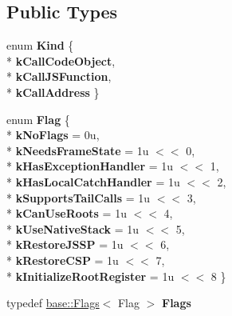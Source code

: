 \subsection*{Public Types}
\begin{DoxyCompactItemize}
\item 
enum {\bfseries Kind} \{ \\*
{\bfseries k\+Call\+Code\+Object}, 
\\*
{\bfseries k\+Call\+J\+S\+Function}, 
\\*
{\bfseries k\+Call\+Address}
 \}\hypertarget{classv8_1_1internal_1_1compiler_1_1_call_descriptor_afedde2451ce98788cc0210f0f161ef3b}{}\label{classv8_1_1internal_1_1compiler_1_1_call_descriptor_afedde2451ce98788cc0210f0f161ef3b}

\item 
enum {\bfseries Flag} \{ \\*
{\bfseries k\+No\+Flags} = 0u, 
\\*
{\bfseries k\+Needs\+Frame\+State} = 1u $<$$<$ 0, 
\\*
{\bfseries k\+Has\+Exception\+Handler} = 1u $<$$<$ 1, 
\\*
{\bfseries k\+Has\+Local\+Catch\+Handler} = 1u $<$$<$ 2, 
\\*
{\bfseries k\+Supports\+Tail\+Calls} = 1u $<$$<$ 3, 
\\*
{\bfseries k\+Can\+Use\+Roots} = 1u $<$$<$ 4, 
\\*
{\bfseries k\+Use\+Native\+Stack} = 1u $<$$<$ 5, 
\\*
{\bfseries k\+Restore\+J\+S\+SP} = 1u $<$$<$ 6, 
\\*
{\bfseries k\+Restore\+C\+SP} = 1u $<$$<$ 7, 
\\*
{\bfseries k\+Initialize\+Root\+Register} = 1u $<$$<$ 8
 \}\hypertarget{classv8_1_1internal_1_1compiler_1_1_call_descriptor_aee4b455cd452621a57aaf6cd61368c4c}{}\label{classv8_1_1internal_1_1compiler_1_1_call_descriptor_aee4b455cd452621a57aaf6cd61368c4c}

\item 
typedef \hyperlink{classv8_1_1base_1_1_flags}{base\+::\+Flags}$<$ Flag $>$ {\bfseries Flags}\hypertarget{classv8_1_1internal_1_1compiler_1_1_call_descriptor_aeac972da3bec5cdaf4ead4bb25ddb486}{}\label{classv8_1_1internal_1_1compiler_1_1_call_descriptor_aeac972da3bec5cdaf4ead4bb25ddb486}

\end{DoxyCompactItemize}
